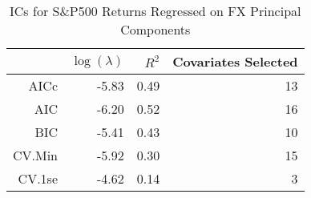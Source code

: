 \begin{table}[ht]
\centering
\begin{tabular}{rrrr}
  \hline
 & $\log(\lambda)$ & $R^2$ & Covariates Selected \\ 
  \hline
AICc & -5.83 & 0.49 &  13 \\ 
  AIC & -6.20 & 0.52 &  16 \\ 
  BIC & -5.41 & 0.43 &  10 \\ 
  CV.Min & -5.92 & 0.30 &  15 \\ 
  CV.1se & -4.62 & 0.14 &   3 \\ 
   \hline
\end{tabular}
\caption{ICs for S\&P500 Returns Regressed on FX Principal Components} 
\label{tab:spreg_ics}
\end{table}

